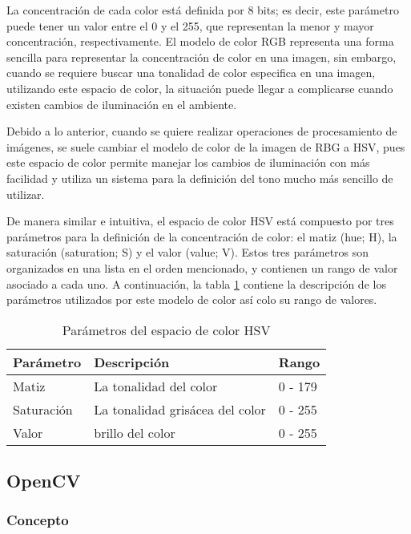 La concentración de cada color está definida por 8 bits; es decir, este parámetro puede tener un valor entre el 0 y el 255, que representan la menor y mayor concentración, respectivamente. El modelo de color RGB representa una forma sencilla para representar la concentración de color en una imagen, sin embargo, cuando se requiere buscar una tonalidad de color especifica en una imagen, utilizando este espacio de color, la situación puede llegar a complicarse cuando existen cambios de iluminación en el ambiente. 

Debido a lo anterior, cuando se quiere realizar operaciones de procesamiento de imágenes, se suele cambiar el modelo de color de la imagen de RBG a HSV, pues este espacio de color permite manejar los cambios de iluminación con más facilidad y utiliza un sistema para la definición del tono mucho más sencillo de utilizar. 

De manera similar e intuitiva, el espacio de color HSV está compuesto por tres parámetros para la definición de la concentración de color: el matiz (hue; H), la saturación (saturation; S) y el valor (value; V). Estos tres parámetros son organizados en una lista en el orden mencionado, y contienen un rango de valor asociado a cada uno. A continuación, la tabla \ref{tab:hsv_param} contiene la descripción de los parámetros utilizados por este modelo de color así colo su rango de valores.

\begin{table}[ht]
    \centering
    \begin{tabular}{lll}
        \hline
        Parámetro & Descripción & Rango\\
        \hline \hline
        Matiz & La tonalidad del color & 0 - 179\\
        Saturación & La tonalidad grisácea del color & 0 - 255\\
        Valor & brillo del color & 0 - 255\\
        \hline \hline
    \end{tabular}
    \caption{Parámetros del espacio de color HSV}
    \label{tab:hsv_param}
\end{table}

\subsection{OpenCV}

\subsubsection{Concepto}

